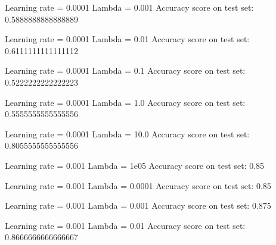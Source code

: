 \documentclass[letterpaper,10pt,english]{sphinxmanual}
\begin{document}
\begin{sphinxVerbatim}[commandchars=\\\{\}]
Learning rate  =  0.0001
Lambda =  0.001
Accuracy score on test set:  0.5888888888888889
\end{sphinxVerbatim}

\begin{sphinxVerbatim}[commandchars=\\\{\}]
Learning rate  =  0.0001
Lambda =  0.01
Accuracy score on test set:  0.6111111111111112
\end{sphinxVerbatim}

\begin{sphinxVerbatim}[commandchars=\\\{\}]
Learning rate  =  0.0001
Lambda =  0.1
Accuracy score on test set:  0.5222222222222223
\end{sphinxVerbatim}

\begin{sphinxVerbatim}[commandchars=\\\{\}]
Learning rate  =  0.0001
Lambda =  1.0
Accuracy score on test set:  0.5555555555555556
\end{sphinxVerbatim}

\begin{sphinxVerbatim}[commandchars=\\\{\}]
Learning rate  =  0.0001
Lambda =  10.0
Accuracy score on test set:  0.8055555555555556
\end{sphinxVerbatim}

\begin{sphinxVerbatim}[commandchars=\\\{\}]
Learning rate  =  0.001
Lambda =  1e\PYGZhy{}05
Accuracy score on test set:  0.85
\end{sphinxVerbatim}

\begin{sphinxVerbatim}[commandchars=\\\{\}]
Learning rate  =  0.001
Lambda =  0.0001
Accuracy score on test set:  0.85
\end{sphinxVerbatim}

\begin{sphinxVerbatim}[commandchars=\\\{\}]
Learning rate  =  0.001
Lambda =  0.001
Accuracy score on test set:  0.875
\end{sphinxVerbatim}

\begin{sphinxVerbatim}[commandchars=\\\{\}]
Learning rate  =  0.001
Lambda =  0.01
Accuracy score on test set:  0.8666666666666667
\end{sphinxVerbatim}
\end{document}
